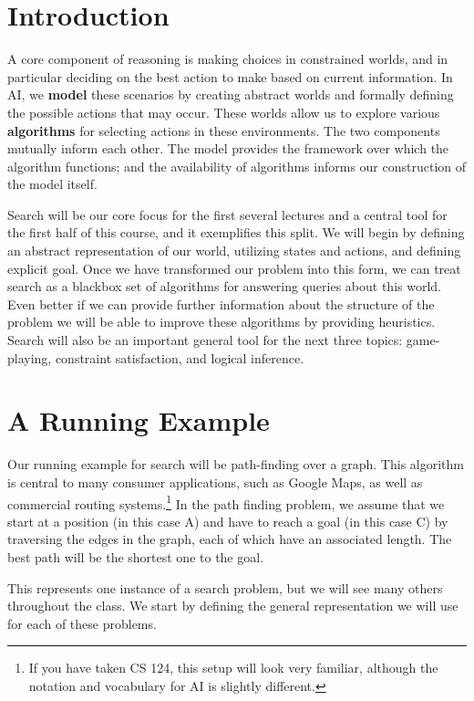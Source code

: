 \documentclass[11pt]{article}
\begin{document}
\MakeScribeTop{}

\tableofcontents

\section{Introduction}

A core component of reasoning is making choices in constrained worlds,
and in particular deciding on the best action to make based on current
information. In AI, we \textbf{model} these scenarios by creating abstract worlds 
and formally defining the possible actions that may occur. These worlds
allow us to explore various \textbf{algorithms} for selecting actions 
in these environments. The two components mutually inform each other. 
The model provides the framework over which the algorithm functions;
and the availability of algorithms informs our construction of the model 
itself. 

Search will be our core focus for the first several lectures and a
central tool for the first half of this course, and it exemplifies
this split. We will begin by defining an abstract representation of
our world, utilizing states and actions, and defining explicit
goal. Once we have transformed our problem into this form, we can
treat search as a blackbox set of algorithms for answering queries
about this world. Even better if we can provide further information
about the structure of the problem we will be able to improve these
algorithms by providing heuristics.  Search will also be an important
general tool for the next three topics: game-playing, constraint
satisfaction, and logical inference.

\section{A Running Example}

Our running example for search will be path-finding over a graph. This
algorithm is central to many consumer applications, such as Google
Maps, as well as commercial routing systems.\footnote{If you have
  taken CS 124, this setup will look very familiar, although the
  notation and vocabulary for AI is slightly different.} In the path
finding problem, we assume that we start at a position (in this case
A) and have to reach a goal (in this case C) by traversing the edges
in the graph, each of which have an associated length. The best path 
will be the shortest one to the goal. 

This represents one instance of a search problem, but we will see 
many others throughout the class. We start by defining the general 
representation we will use for each of these problems. 
\end{document}
